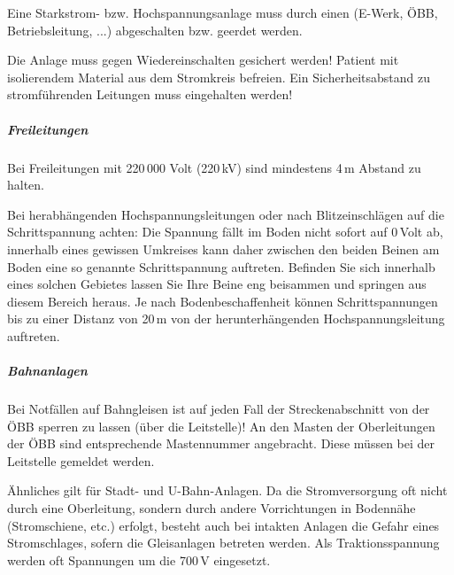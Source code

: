 {
\label{topic:gefahrenbereich-strom}

Eine Starkstrom- bzw. Hochspannungsanlage muss durch einen 
(E-Werk, ÖBB, Betriebsleitung, ...) abgeschalten bzw. geerdet werden. 

Die Anlage muss
gegen Wiedereinschalten gesichert werden! Patient mit isolierendem
Material aus dem Stromkreis befreien. Ein Sicherheitsabstand zu
stromführenden Leitungen muss eingehalten werden! 



\subparagraph{Freileitungen}

Bei Freileitungen mit
220\,000 Volt (220\,kV) sind mindestens 4\,m Abstand zu halten.
\cite{Jaros1} 

Bei herabhängenden Hochspannungsleitungen oder
nach Blitzeinschlägen auf die Schrittspannung achten: Die
Spannung fällt im Boden nicht sofort auf 0\,Volt ab, innerhalb
eines gewissen Umkreises kann daher zwischen den beiden
Beinen am Boden eine so genannte Schrittspannung auftreten.
Befinden Sie sich innerhalb eines solchen Gebietes lassen Sie
Ihre Beine eng beisammen und springen aus diesem Bereich
heraus. Je nach Bodenbeschaffenheit können Schrittspannungen
bis zu einer Distanz von 20\,m von der herunterhängenden
Hochspannungsleitung auftreten. \cite{RedelsteinerHRNS1} 

\subparagraph{Bahnanlagen}
Bei
Notfällen auf Bahngleisen ist auf jeden Fall der
Streckenabschnitt von der ÖBB sperren zu lassen (über die
Leitstelle)! An den Masten der Oberleitungen der ÖBB sind
entsprechende Mastennummer angebracht. Diese müssen bei der Leitstelle gemeldet
werden. 

Ähnliches gilt für Stadt- und U-Bahn-Anlagen. Da die Stromversorgung oft nicht
durch eine Oberleitung, sondern durch andere Vorrichtungen in
Bodennähe (Stromschiene, etc.) erfolgt, besteht auch bei intakten Anlagen die
Gefahr eines Stromschlages, sofern die Gleisanlagen betreten werden. Als
Traktionsspannung werden oft Spannungen um die 700\,V eingesetzt. \cite{U61989}
}{

}{}{}{}


